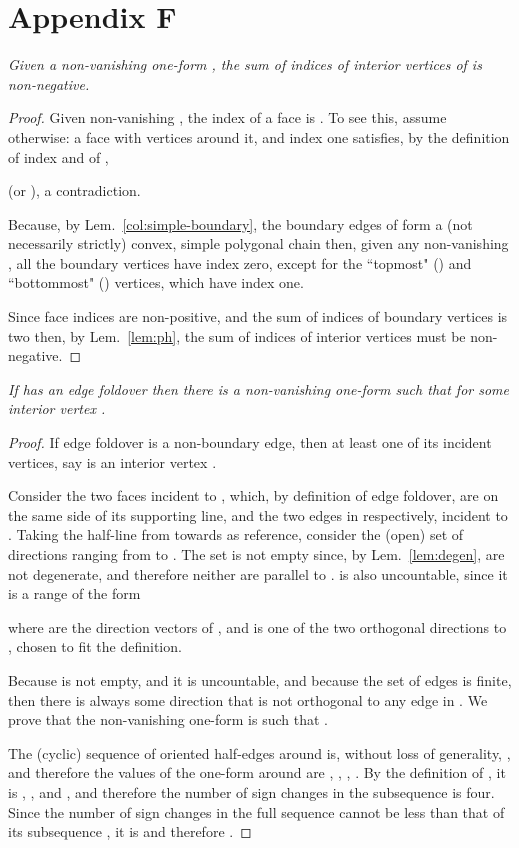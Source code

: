 \documentclass[11pt]{article}
\begin{document}
\section*{Appendix F}\label{app:interior}



\emph{
	Given a non-vanishing one-form , the sum of indices of interior vertices of  is non-negative. 
}
\begin{proof}
Given non-vanishing , 
the index of a face  is . 
To see this, assume otherwise: a face with vertices  around it, and index one satisfies, by the
definition of index and of , 
 
(or ), a
contradiction. 

Because, by Lem.~\ref{col:simple-boundary}, the boundary edges of  form a (not necessarily
strictly) convex, simple polygonal chain then, given any non-vanishing , all the boundary vertices have
index zero, except for the ``topmost" () 
and ``bottommost" () vertices, which have
index one. 

Since face indices are non-positive, and the sum of indices of
boundary vertices is two then, by Lem.~\ref{lem:ph},
the sum of indices of {interior} vertices must be non-negative. 
\end{proof}






\emph{
If  has an edge foldover then there is a non-vanishing one-form  such
that  for some interior vertex . }
\begin{proof}
If edge foldover  is a non-boundary edge, then at least one
of its incident vertices, say  is an interior vertex . 

Consider the two faces  incident to , which, by definition of
edge foldover, are on the same side of its
supporting line, and the two edges  in  respectively,
incident to . 
Taking the half-line  from  towards  as reference, consider 
the (open) set  of directions ranging from  to
. 
The set  is not empty since, by Lem.~\ref{lem:degen},
 are not degenerate, and therefore neither  are parallel
to .  is also uncountable, since it is a range of the form

where  are the direction vectors of , and
 is one of the two orthogonal directions to , 
chosen to fit the definition. 

Because  is not empty, and it is uncountable, and because the set of edges  is finite,
then there is always some direction  that is not orthogonal to any edge in
. We prove that the non-vanishing one-form  is such that
. 

The (cyclic) sequence of oriented half-edges {around}  is, without loss of generality,
, and therefore the values of the
one-form around  are , ,
, . 
By the definition of , it is , ,
and , and therefore 
the number of sign changes in 
the subsequence
 is four. 
Since the number of sign changes in the full sequence  cannot
be less
than that of its subsequence , 
it is  and therefore . 
\end{proof}
\end{document}
